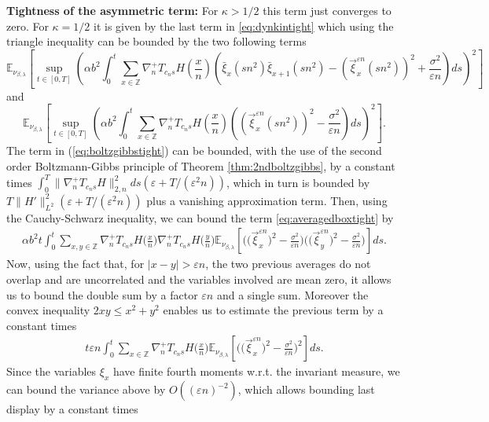 \documentclass[a4paper, reqno, 12pt]{amsart}
\theoremstyle{plain}
\theoremstyle{definition}
\newcommand{\ee}[1]{\mathbb{E}_{\nu_{\beta,\lambda}}\left[ #1 \right]}
\newcommand{\Z}{\mathbb{Z}}
\begin{document}
\textbf{Tightness of the asymmetric term:}
For $\kappa>1/2$ this term just converges to zero.
For $\kappa = 1/2$ it is given by the last term in \eqref{eq:dynkintight} which using the triangle inequality can be bounded by the two following terms 
\begin{equation} 
\label{eq:boltzgibbstight}
    \ee{ \sup_{t\in[0,T]}\left(\alpha b^2  \int_0^t \sum_{x\in\Z} \nabla_n^+T_{c_ns}H\left(\frac{x}{n}\right)\left(\bar{\xi}_x(sn^2)\bar{\xi}_{x+1}(sn^2) -\left(\overrightarrow{\xi}^{\varepsilon n}_x(sn^2)\right)^2 + \frac{\sigma^2}{\varepsilon n}\right) ds \right)^2}
\end{equation}
and 
\begin{equation} 
\label{eq:averagedboxtight}
    \ee{ \sup_{t\in[0,T]} \left( \alpha b^2 \int_0^t \sum_{x\in\Z} \nabla_n^+T_{c_ns}H\left(\frac{x}{n}\right)\left( \left(\overrightarrow{\xi}^{\varepsilon n}_x(sn^2)\right)^2 - \frac{\sigma^2}{\varepsilon n} \right)ds\right)^2}.
\end{equation}
The term in (\ref{eq:boltzgibbstight}) can be bounded, with the use of the second order Boltzmann-Gibbs principle of Theorem \ref{thm:2ndboltzgibbs}, by a constant times $\int_0^T\|\nabla^+_n T_{c_ns}H\|_{2,n}^2 ds(\varepsilon + T/(\varepsilon^2n))$, which in turn is bounded by $T\|H'\|_{L^2}^2(\varepsilon + T/(\varepsilon^2n))$ plus a vanishing approximation term.
Then, using the Cauchy-Schwarz inequality, we can bound the term \eqref{eq:averagedboxtight} by 
\begin{align*}
    \alpha b^2 t \int_0^t \sum_{x,y\in\Z}\nabla^+_n T_{c_ns}H\bigg(\frac{x}{n}\bigg)\nabla^+_nT_{c_ns}H\bigg(\frac{y}{n}\bigg) \ee{\bigg(\Big(\overrightarrow{\xi}^{\varepsilon n}_x\Big)^2-\frac{\sigma^2}{\varepsilon n }\bigg) \bigg(\Big(\overrightarrow{\xi}^{\varepsilon n}_y\Big)^2-\frac{\sigma^2}{\varepsilon n}\bigg)}ds. 
\end{align*}
Now, using  the fact that, for $|x-y| > \varepsilon n$, the two previous averages  do not overlap and are uncorrelated and the variables involved are mean zero, it allows us to bound the double sum by a factor $\varepsilon n$ and a single sum. Moreover the convex inequality $2xy\leq x^2+y^2$ enables us to estimate the previous term by a constant times
\begin{align*}
    t \varepsilon n \int_0^t \sum_{x\in\Z}\nabla^+_n T_{c_ns}H\bigg(\frac{x}{n}\bigg) \ee{\bigg(\Big(\overrightarrow{\xi}^{\varepsilon n}_x\Big)^2-\frac{\sigma^2}{\varepsilon n }\bigg)^2}ds.
\end{align*}
Since the variables $\xi_x$ have finite fourth moments w.r.t. the invariant measure, we can bound the variance above by $O((\varepsilon n)^{-2})$, which allows bounding last display by a constant times
\end{document}
